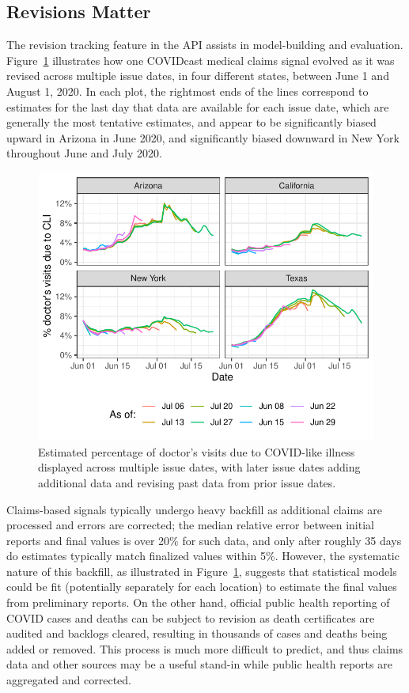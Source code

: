 \documentclass[9pt,twocolumn,twoside,lineno]{pnas-new}
\begin{document}
\subsection{Revisions Matter}

The revision tracking feature in the API assists in model-building and
evaluation. Figure~\ref{fig:dv_as_of} illustrates how one COVIDcast medical
claims signal evolved as it was revised across multiple issue dates, in four
different states, between June 1 and August 1, 2020. In each plot, the rightmost
ends of the lines correspond to estimates for the last day that data are
available for each issue date, which are generally the most tentative estimates,
and appear to be significantly biased upward in Arizona in June 2020, and
significantly biased downward in New York throughout June and July 2020.

\begin{figure}
\centering
\includegraphics[width=\columnwidth]{fig/dv_as_of.pdf}
\caption{Estimated percentage of doctor's visits due to COVID-like illness
  displayed across multiple issue dates, with later issue dates adding
  additional data and revising past data from prior issue dates.}
\label{fig:dv_as_of}
\end{figure}

Claims-based signals typically undergo heavy backfill as additional claims are
processed and errors are corrected; the median relative error between initial
reports and final values is over 20\% for such data, and only after roughly 35
days do estimates typically match finalized values within 5\%. However, the
systematic nature of this backfill, as illustrated in Figure~\ref{fig:dv_as_of},
suggests that statistical models could be fit (potentially separately for each
location) to estimate the final values from preliminary reports. On the other
hand, official public health reporting of COVID cases and deaths can be subject
to revision as death certificates are audited and backlogs cleared, resulting in
thousands of cases and deaths being added or removed. This process is much more
difficult to predict, and thus claims data and other sources may be a useful
stand-in while public health reports are aggregated and corrected.
\end{document}
